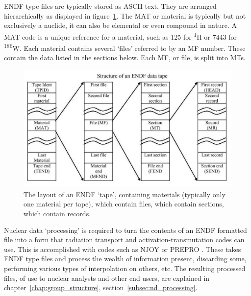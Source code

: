 ENDF type files are typically stored as ASCII  text. They are arranged hierarchically as displayed in figure~\ref{fig:endf}. The MAT or material is typically but not exclusively a nuclide, it can also be elemental or even compound in nature. A MAT code is a unique reference for a material, such as 125 for \textsuperscript{1}H or 7443 for \textsuperscript{186}W. Each material contains several `files' referred to by an MF number. These contain the data listed in the sections below. Each MF, or file, is split into MTs. 

\begin{figure}[ht]
  \includegraphics[width=\textwidth]{endf_architecture}
  \caption[Evaluated Nuclear Data Format (ENDF) file architecture.]{The layout of an ENDF `tape', containing materials (typically only one material per tape), which contain files, which contain sections, which contain records.}
  \label{fig:endf}
\end{figure}

Nuclear data `processing' is required to turn the contents of an ENDF formatted file into a form that radiation transport and activation-transmutation codes can use. This is accomplished with codes such as NJOY \cite{MacFarlane2010} or PREPRO \cite{cullen2017}. These takes ENDF type files and process the wealth of information present, discarding some, performing various types of interpolation on others, etc. The resulting processed files, of use to nuclear analysts and other end users, are explained in chapter~\ref{chap:group_structure}, section~\ref{subsec:nd_processing}.

